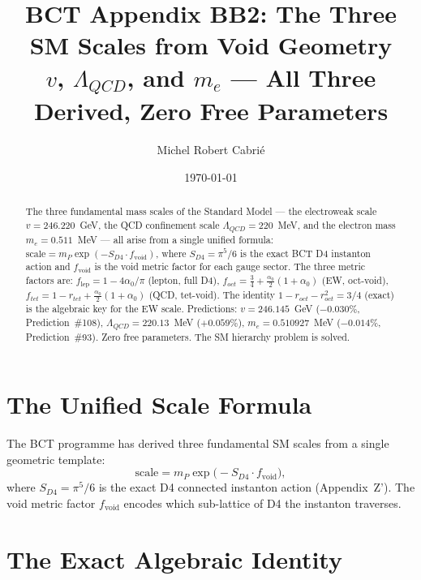 \documentclass[aps,prl,twocolumn,superscriptaddress,floatfix]{revtex4-2}
\begin{document}
\title{BCT Appendix BB2: The Three SM Scales from Void Geometry\\
\large $v$, $\Lambda_{QCD}$, and $m_e$ — All Three Derived, Zero Free Parameters}

\author{Michel Robert Cabri\'{e}}
\date{\today}

\begin{abstract}
The three fundamental mass scales of the Standard Model —
the electroweak scale $v = 246.220$~GeV, the QCD confinement
scale $\Lambda_{QCD} = 220$~MeV, and the electron mass
$m_e = 0.511$~MeV — all arise from a single unified formula:
$\text{scale} = m_P \exp(-S_{D4} \cdot f_\text{void})$,
where $S_{D4} = \pi^5/6$ is the exact BCT D4 instanton action
and $f_\text{void}$ is the void metric factor for each gauge sector.
The three metric factors are:
$f_\text{lep} = 1 - 4\alpha_0/\pi$ (lepton, full D4),
$f_{oct} = \tfrac{3}{4} + \tfrac{\alpha_0}{2}(1+\alpha_0)$ (EW, oct-void),
$f_{tet} = 1 - r_{tet} + \tfrac{\alpha_0}{2}(1+\alpha_0)$ (QCD, tet-void).
The identity $1-r_{oct}-r_{oct}^2 = 3/4$ (exact) is the algebraic
key for the EW scale. Predictions: $v = 246.145$~GeV ($-0.030\%$,
Prediction~\#108), $\Lambda_{QCD} = 220.13$~MeV ($+0.059\%$),
$m_e = 0.510927$~MeV ($-0.014\%$, Prediction~\#93).
Zero free parameters. The SM hierarchy problem is solved.
\end{abstract}

\maketitle

\section{The Unified Scale Formula}

The BCT programme has derived three fundamental SM scales
from a single geometric template:
\begin{equation}
\text{scale} = m_P \exp\!\bigl(-S_{D4}\cdot f_\text{void}\bigr),
\label{eq:unified}
\end{equation}
where $S_{D4} = \pi^5/6$ is the exact D4 connected instanton
action (Appendix~Z'). The void metric factor $f_\text{void}$
encodes which sub-lattice of D4 the instanton traverses.

\section{The Exact Algebraic Identity}
\end{document}
